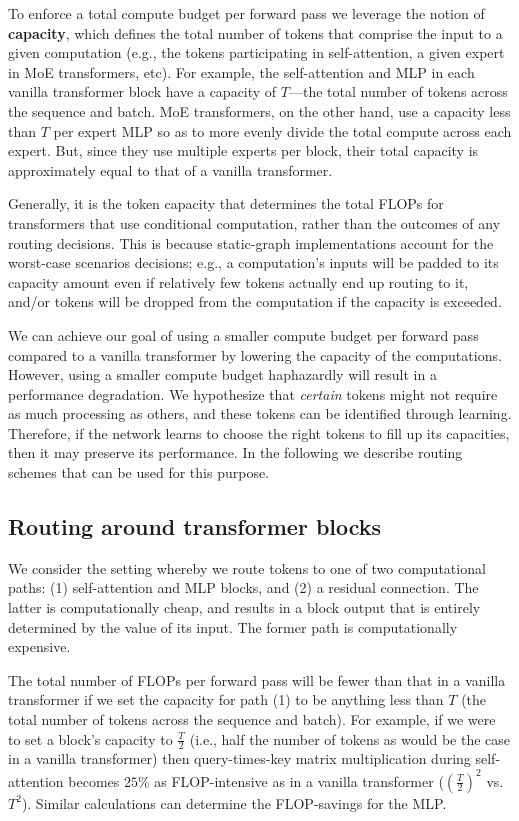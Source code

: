 \documentclass[11pt, a4paper, onecolumn, logo, copyright]{googledeepmind}
\begin{document}
To enforce a total compute budget per forward pass we leverage the notion of \textbf{capacity}, which defines the total number of tokens that comprise the input to a given computation (e.g., the tokens participating in self-attention, a given expert in MoE transformers, etc). For example, the self-attention and MLP in each vanilla transformer block have a capacity of $T$---the total number of tokens across the sequence and batch. MoE transformers, on the other hand, use a capacity less than $T$ per expert MLP so as to more evenly divide the total compute across each expert. But, since they use multiple experts per block, their total capacity is approximately equal to that of a vanilla transformer.

Generally, it is the token capacity that determines the total FLOPs for transformers that use conditional computation, rather than the outcomes of any routing decisions. This is because static-graph implementations account for the worst-case scenarios decisions; e.g., a computation's inputs will be padded to its capacity amount even if relatively few tokens actually end up routing to it, and/or tokens will be dropped from the computation if the capacity is exceeded.

We can achieve our goal of using a smaller compute budget per forward pass compared to a vanilla transformer by lowering the capacity of the computations. However, using a smaller compute budget haphazardly will result in a performance degradation. We hypothesize that \textit{certain} tokens might not require as much processing as others, and these tokens can be identified through learning. Therefore, if the network learns to choose the right tokens to fill up its capacities, then it may preserve its performance. In the following we describe routing schemes that can be used for this purpose.

\subsection{Routing around transformer blocks}
\label{sec:routing-to-nowhere}
We consider the setting whereby we route tokens to one of two computational paths: (1) self-attention and MLP blocks, and (2) a residual connection. The latter is computationally cheap, and results in a block output that is entirely determined by the value of its input. The former path is computationally expensive.

The total number of FLOPs per forward pass will be fewer than that in a vanilla transformer if we set the capacity for path (1) to be anything less than $T$ (the total number of tokens across the sequence and batch). For example, if we were to set a block's capacity to  $\frac{T}{2}$ (i.e., half the number of tokens as would be the case in a vanilla transformer) then query-times-key matrix multiplication during self-attention becomes $25\%$ as FLOP-intensive as in a vanilla transformer ($(\frac{T}{2})^2$ vs. $T^2$). Similar calculations can determine the FLOP-savings for the MLP.
\end{document}
